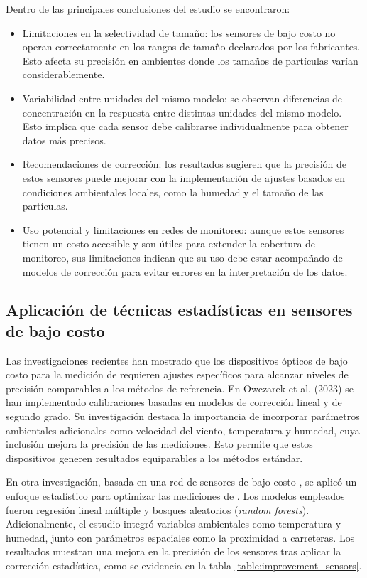 Dentro de las principales conclusiones del estudio se encontraron: 

\begin{itemize}
	\item Limitaciones en la selectividad de tamaño: los sensores de bajo costo no operan correctamente en los rangos de tamaño declarados por los fabricantes.  Esto afecta su precisión en ambientes donde los tamaños de partículas varían considerablemente.

	\item Variabilidad entre unidades del mismo modelo:  se observan diferencias de concentración en la respuesta entre distintas unidades del mismo modelo. Esto implica que cada sensor debe calibrarse individualmente para obtener datos más precisos.

	\item Recomendaciones de corrección:  los resultados sugieren que la precisión de estos sensores puede mejorar con la implementación de ajustes basados en condiciones ambientales locales, como la humedad y el tamaño de las partículas.

	\item Uso potencial y limitaciones en redes de monitoreo: aunque estos sensores tienen un costo accesible y son útiles para extender la cobertura de monitoreo, sus limitaciones indican que su uso debe estar acompañado de modelos de corrección para evitar errores en la interpretación de los datos.
	
\end{itemize}


\subsection{Aplicación de técnicas estadísticas en sensores de bajo costo}
Las investigaciones recientes han mostrado que los dispositivos ópticos de bajo costo para la medición de \MPF requieren ajustes específicos para alcanzar niveles de precisión comparables a los métodos de referencia. En Owczarek et al. (2023) \citep{Owczarek2023} se han implementado calibraciones basadas en modelos de corrección lineal y de segundo grado. Su investigación destaca la importancia de incorporar parámetros ambientales adicionales como velocidad del viento, temperatura y humedad, cuya inclusión mejora la precisión de las mediciones. Esto permite que estos dispositivos generen resultados equiparables a los métodos estándar.

En otra investigación, basada en una red de sensores de bajo costo \citep{Ellen2021}, se aplicó un enfoque estadístico para optimizar las mediciones de \MPF. Los modelos empleados fueron regresión lineal múltiple y bosques aleatorios (\textit{random forests}). Adicionalmente, el estudio integró variables ambientales como temperatura y humedad, junto con parámetros espaciales como la proximidad a carreteras. Los resultados muestran una mejora en la precisión de los sensores tras aplicar la corrección estadística, como se evidencia en la tabla \ref{table:improvement_sensors}.

